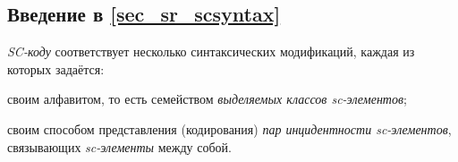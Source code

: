 \subsection*{Введение в \ref{sec_sr_scsyntax}}
\textit{SC-коду} соответствует несколько синтаксических модификаций, каждая из которых задаётся:
\begin{textitemize}
	\item своим алфавитом, то есть семейством \textit{ выделяемых классов sc-элементов};
	\item своим способом представления (кодирования) \textit{пар инцидентности sc-элементов}, связывающих \textit{sc-элементы} между собой.
\end{textitemize}

\begin{SCn}
\end{SCn}

